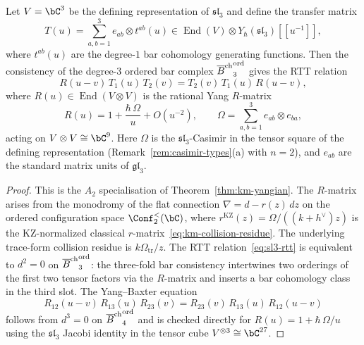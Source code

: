 \begin{theorem}
\label{thm:sl3-rtt}
Let $V=\bC^3$ be the defining representation of
$\mathfrak{sl}_3$ and define the transfer matrix
\[
T(u)
=\sum_{a,b=1}^{3}e_{ab}\otimes t^{ab}(u)
\in \operatorname{End}(V)\otimes Y_\hbar(\mathfrak{sl}_3)[\![u^{-1}]\!],
\]
where $t^{ab}(u)$ are the degree-$1$ bar cohomology generating
functions. Then the consistency of the degree-$3$ ordered bar complex
${\overline{B}^{\mathrm{ch}}}^{\mathrm{ord}}_3$ gives the RTT relation
\begin{equation}\label{eq:sl3-rtt}
R(u{-}v)\,T_1(u)\,T_2(v)
=T_2(v)\,T_1(u)\,R(u{-}v),
\end{equation}
where $R(u)\in\operatorname{End}(V\otimes V)$ is the rational
Yang $R$-matrix
\begin{equation}\label{eq:sl3-R-matrix}
R(u)=1+\frac{\hbar\,\Omega}{u}+O(u^{-2}),
\qquad
\Omega=\sum_{a,b=1}^{3}e_{ab}\otimes e_{ba},
\end{equation}
acting on $V\otimes V\cong\bC^9$. Here
$\Omega$ is the $\mathfrak{sl}_3$-Casimir in the tensor square of
the defining representation
\textup{(}Remark~\textup{\ref{rem:casimir-types}(a)} with $n=2$\textup{)},
and $e_{ab}$ are the standard matrix units of $\mathfrak{gl}_3$.
\end{theorem}

\begin{proof}
This is the $A_2$ specialisation of Theorem~\ref{thm:km-yangian}.
The $R$-matrix arises from the monodromy of the flat connection
$\nabla=d-r(z)\,dz$ on the ordered configuration space
$\Conf_2^<(\bC)$, where
$r^{\mathrm{KZ}}(z)=\Omega/((k+h^\vee)z)$ is the
KZ-normalized classical $r$-matrix~\eqref{eq:km-collision-residue}.
The underlying trace-form collision residue is
$k\Omega_{\mathrm{tr}}/z$.
The RTT relation~\eqref{eq:sl3-rtt} is equivalent to $d^2=0$ on
${\overline{B}^{\mathrm{ch}}}^{\mathrm{ord}}_3$: the three-fold bar consistency
intertwines two orderings of the first two tensor factors via the
$R$-matrix and inserts a bar cohomology class in the third slot.
The Yang--Baxter equation
\[
R_{12}(u{-}v)\,R_{13}(u)\,R_{23}(v)
=R_{23}(v)\,R_{13}(u)\,R_{12}(u{-}v)
\]
follows from $d^3=0$ on ${\overline{B}^{\mathrm{ch}}}^{\mathrm{ord}}_4$ and is checked
directly for $R(u)=1+\hbar\,\Omega/u$ using the $\mathfrak{sl}_3$
Jacobi identity in the tensor cube $V^{\otimes 3}\cong\bC^{27}$.
\end{proof}

